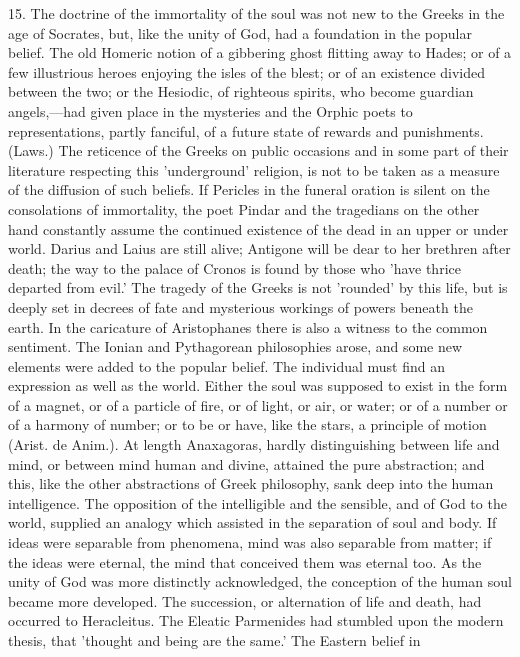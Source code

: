 15. The doctrine of the immortality of the soul was not new to the Greeks
in the age of Socrates, but, like the unity of God, had a foundation in
the popular belief. The old Homeric notion of a gibbering ghost flitting
away to Hades; or of a few illustrious heroes enjoying the isles of the
blest; or of an existence divided between the two; or the Hesiodic, of
righteous spirits, who become guardian angels,—had given place in
the mysteries and the Orphic poets to representations, partly fanciful, of
a future state of rewards and punishments. (Laws.) The reticence of the
Greeks on public occasions and in some part of their literature respecting
this 'underground' religion, is not to be taken as a measure of the
diffusion of such beliefs. If Pericles in the funeral oration is silent on
the consolations of immortality, the poet Pindar and the tragedians on the
other hand constantly assume the continued existence of the dead in an
upper or under world. Darius and Laius are still alive; Antigone will be
dear to her brethren after death; the way to the palace of Cronos is found
by those who 'have thrice departed from evil.' The tragedy of the Greeks
is not 'rounded' by this life, but is deeply set in decrees of fate and
mysterious workings of powers beneath the earth. In the caricature of
Aristophanes there is also a witness to the common sentiment. The Ionian
and Pythagorean philosophies arose, and some new elements were added to
the popular belief. The individual must find an expression as well as the
world. Either the soul was supposed to exist in the form of a magnet, or
of a particle of fire, or of light, or air, or water; or of a number or of
a harmony of number; or to be or have, like the stars, a principle of
motion (Arist. de Anim.). At length Anaxagoras, hardly distinguishing
between life and mind, or between mind human and divine, attained the pure
abstraction; and this, like the other abstractions of Greek philosophy,
sank deep into the human intelligence. The opposition of the intelligible
and the sensible, and of God to the world, supplied an analogy which
assisted in the separation of soul and body. If ideas were separable from
phenomena, mind was also separable from matter; if the ideas were eternal,
the mind that conceived them was eternal too. As the unity of God was more
distinctly acknowledged, the conception of the human soul became more
developed. The succession, or alternation of life and death, had occurred
to Heracleitus. The Eleatic Parmenides had stumbled upon the modern
thesis, that 'thought and being are the same.' The Eastern belief in
